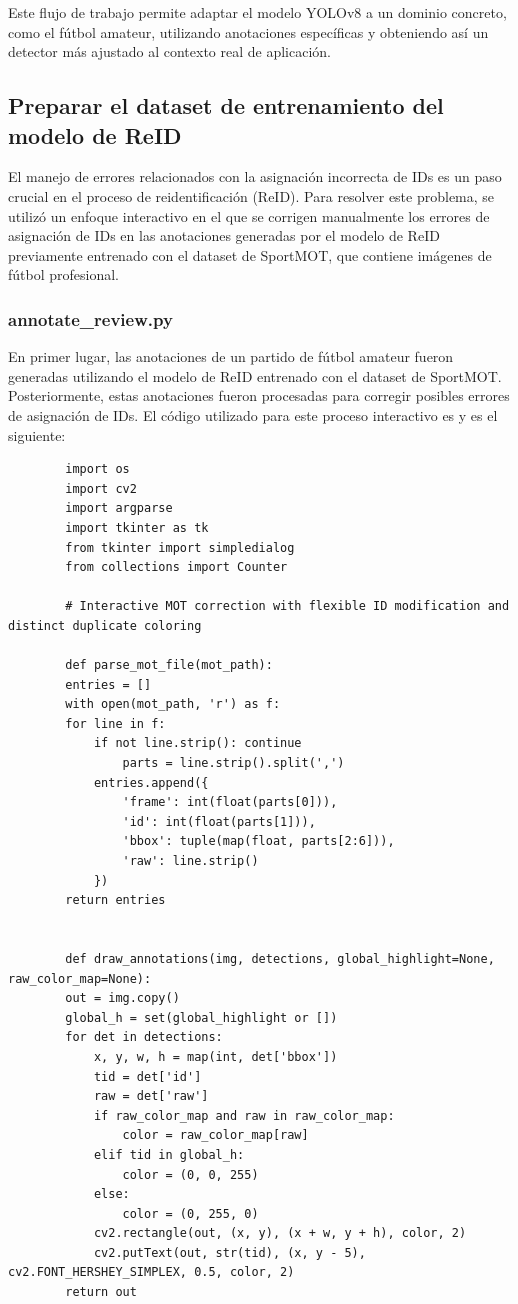 \documentclass[12pt, a4paper, twoside]{article}
\begin{document}
	Este flujo de trabajo permite adaptar el modelo YOLOv8 a un dominio concreto, como el fútbol amateur, utilizando anotaciones específicas y obteniendo así un detector más ajustado al contexto real de aplicación.
	
	
	\subsection{Preparar el dataset de entrenamiento del modelo de ReID}
	
	El manejo de errores relacionados con la asignación incorrecta de IDs es un paso crucial en el proceso de reidentificación (ReID). Para resolver este problema, se utilizó un enfoque interactivo en el que se corrigen manualmente los errores de asignación de IDs en las anotaciones generadas por el modelo de ReID previamente entrenado con el dataset de SportMOT, que contiene imágenes de fútbol profesional.
	
	\subsubsection{annotate\_review.py}
	
	En primer lugar, las anotaciones de un partido de fútbol amateur fueron generadas utilizando el modelo de ReID entrenado con el dataset de SportMOT. Posteriormente, estas anotaciones fueron procesadas para corregir posibles errores de asignación de IDs. El código utilizado para este proceso interactivo es  y es el siguiente:
	
	\begin{verbatim}
		import os
		import cv2
		import argparse
		import tkinter as tk
		from tkinter import simpledialog
		from collections import Counter
		
		# Interactive MOT correction with flexible ID modification and distinct duplicate coloring
		
		def parse_mot_file(mot_path):
		entries = []
		with open(mot_path, 'r') as f:
		for line in f:
			if not line.strip(): continue
				parts = line.strip().split(',')
			entries.append({
				'frame': int(float(parts[0])), 
				'id': int(float(parts[1])), 
				'bbox': tuple(map(float, parts[2:6])),
				'raw': line.strip()
			})
		return entries
		
		
		def draw_annotations(img, detections, global_highlight=None, raw_color_map=None):
		out = img.copy()
		global_h = set(global_highlight or [])
		for det in detections:
			x, y, w, h = map(int, det['bbox'])
			tid = det['id']
			raw = det['raw']
			if raw_color_map and raw in raw_color_map:
				color = raw_color_map[raw]
			elif tid in global_h:
				color = (0, 0, 255)
			else:
				color = (0, 255, 0)
			cv2.rectangle(out, (x, y), (x + w, y + h), color, 2)
			cv2.putText(out, str(tid), (x, y - 5), cv2.FONT_HERSHEY_SIMPLEX, 0.5, color, 2)
		return out
	\end{verbatim}
	
\end{document}
